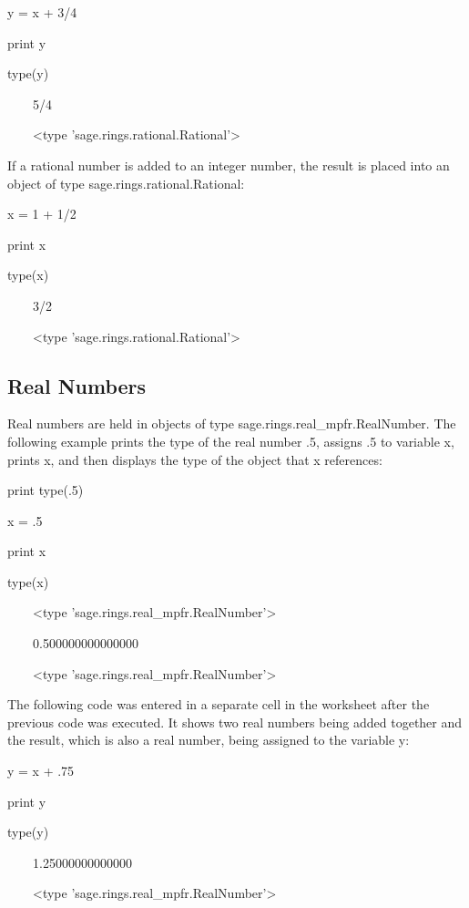 \documentclass[12pt,oneside]{book}
\begin{document}
y = x + 3/4

print y

type(y)

{\textbar}

\ \ \ \ 5/4

\ \ \ \ {\textless}type 'sage.rings.rational.Rational'{\textgreater}

If a rational number is added to an integer number, the result is placed into an object of type sage.rings.rational.Rational:


x = 1 + 1/2

print x

type(x)

{\textbar}

\ \ \ \ 3/2

\ \ \ \ {\textless}type 'sage.rings.rational.Rational'{\textgreater}

\subsection[Real Numbers]{Real Numbers}

Real numbers are held in objects of type sage.rings.real\_mpfr.RealNumber. The following example prints the type of the real number .5, assigns .5 to variable x, prints x, and then displays the type of the object that x references:

print type(.5)

x = .5

print x

type(x)

{\textbar}

\ \ \ \ {\textless}type 'sage.rings.real\_mpfr.RealNumber'{\textgreater}

\ \ \ \ 0.500000000000000

\ \ \ \ {\textless}type 'sage.rings.real\_mpfr.RealNumber'{\textgreater}

The following code was entered in a separate cell in the worksheet after the previous code was executed. It shows two real numbers being added together and the result, which is also a real number, being assigned to the variable y:

y = x + .75

print y

type(y)

{\textbar}

\ \ \ \ 1.25000000000000

\ \ \ \ {\textless}type 'sage.rings.real\_mpfr.RealNumber'{\textgreater}
\end{document}
